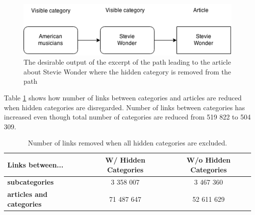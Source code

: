 \begin{figure}[h]
\centering
\includegraphics[width=.7\textwidth]{Chapters/Implementation/HiddenCategories/Stevie_wonder}
\caption[Example path without hidden category]{The desirable output of the excerpt of the path leading to the article about Stevie Wonder where the hidden category is removed from the path}
\label{fig:stevie_wonder}
\end{figure}

Table \ref{tab:withouthiddencat} shows how number of links between categories and articles are reduced when hidden categories are disregarded. Number of links between categories has increased even though total number of categories are reduced from 519 822 to 504 309.


\begin{table}[h]
\centering
\renewcommand{\arraystretch}{1.25}
\begin{tabular}{l|c|c}
\textbf{Links between...} & \textbf{W/ Hidden Categories} & \textbf{W/o Hidden Categories}  \\ \hline
 \textbf{subcategories} & 3 358 007  & 3 467 360\\
 \textbf{articles and categories} & 71 487 647  & 52 611 629 
\end{tabular}
\\[10pt]
\caption[Number of links without hidden categories]{Number of links removed when all hidden categories are excluded. }
\label{tab:withouthiddencat}
\end{table}

